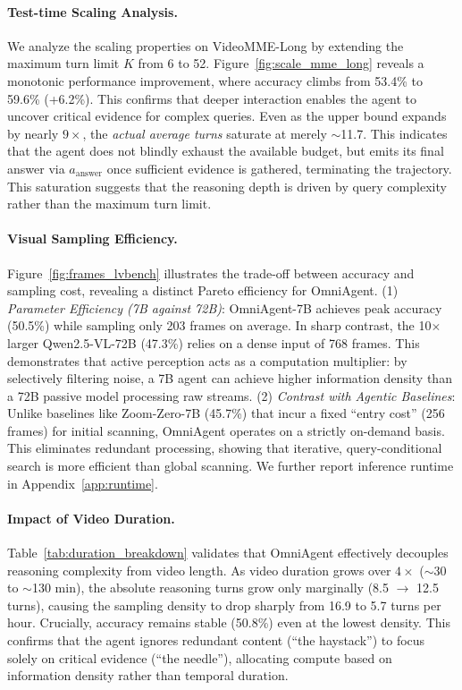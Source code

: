 \documentclass{article}
\theoremstyle{plain}
\theoremstyle{definition}
\theoremstyle{remark}
\begin{document}
\paragraph{Test-time Scaling Analysis.}
\label{sec:test_time_scaling}
We analyze the scaling properties on VideoMME-Long by extending the maximum turn limit $K$ from 6 to 52. Figure~\ref{fig:scale_mme_long} reveals a monotonic performance improvement, where accuracy climbs from 53.4\% to 59.6\% (+6.2\%). This confirms that deeper interaction enables the agent to uncover critical evidence for complex queries. 
Even as the upper bound expands by nearly $9\times$, the \textit{actual
average turns} saturate at merely $\sim$11.7. This indicates that the
agent does not blindly exhaust the available budget, but emits its final
answer via $a_{\text{answer}}$ once sufficient evidence is gathered,
terminating the trajectory.
This saturation suggests that the reasoning depth is driven by query complexity rather than the maximum turn limit.


\paragraph{Visual Sampling Efficiency.}
\label{sec:efficiency}
Figure~\ref{fig:frames_lvbench} illustrates the trade-off between accuracy and sampling cost, revealing a distinct Pareto efficiency for OmniAgent.
(1) \textit{Parameter Efficiency (7B against 72B)}: OmniAgent-7B achieves peak accuracy (50.5\%) while sampling only 203 frames on average. In sharp contrast, the 10$\times$ larger Qwen2.5-VL-72B (47.3\%) relies on a dense input of 768 frames. This demonstrates that active perception acts as a computation multiplier: by selectively filtering noise, a 7B agent can achieve higher information density than a 72B passive model processing raw streams.
(2) \textit{Contrast with Agentic Baselines}: Unlike baselines like Zoom-Zero-7B (45.7\%) that incur a fixed ``entry cost'' (256 frames) for initial scanning, OmniAgent operates on a strictly on-demand basis. This eliminates redundant processing, showing that iterative, query-conditional search is more efficient than global scanning. We further report inference runtime in Appendix~\ref{app:runtime}.


\paragraph{Impact of Video Duration.}
\label{sec:duration}
Table~\ref{tab:duration_breakdown} validates that OmniAgent effectively decouples reasoning complexity from video length. As video duration grows over $4\times$ ($\sim$30 to $\sim$130 min), the absolute reasoning turns grow only marginally (8.5 $\to$ 12.5 turns), causing the sampling density to drop sharply from 16.9 to 5.7 turns per hour. Crucially, accuracy remains stable (50.8\%) even at the lowest density. This confirms that the agent ignores redundant content (``the haystack'') to focus solely on critical evidence (``the needle''), allocating compute based on information density rather than temporal duration. 
\end{document}
